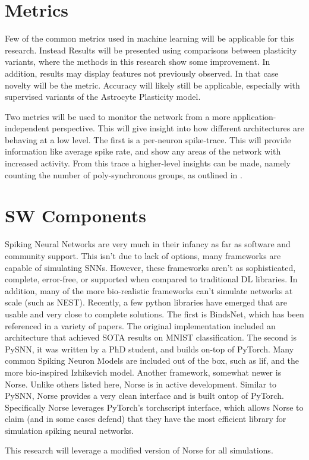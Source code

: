     \section{Metrics} \label{section:metrics}
    Few of the common metrics used in machine learning will be applicable for
    this research. Instead Results will be presented using comparisons between
    plasticity variants, where the methods in this research show some
    improvement. In addition, results may display features not previously
    observed. In that case novelty will be the metric. Accuracy will likely
    still be applicable, especially with supervised variants of the Astrocyte
    Plasticity model.
    
    Two metrics will be used to monitor the network from a more
    application-independent perspective. This will give insight into how
    different architectures are behaving at a low level. The first is a
    per-neuron spike-trace. This will provide information like average spike
    rate, and show any areas of the network with increased activity. From this
    trace a higher-level insights can be made, namely counting the number of
    poly-synchronous groups, as outlined in \cite{sgnn_transistor}.
    
    \section{SW Components}
    Spiking Neural Networks are very much in their infancy as far as software
    and community support. This isn't due to lack of options, many frameworks
    are capable of simulating SNNs. However, these frameworks aren't as
    sophisticated, complete, error-free, or supported when compared to
    traditional DL libraries. In addition, many of the more bio-realistic
    frameworks can't simulate networks at scale (such as NEST). Recently, a few
    python libraries have emerged that are usable and very close to complete
    solutions. The first is BindsNet, which has been referenced in a variety of
    papers. The original implementation included an architecture that achieved
    SOTA results on MNIST classification. The second is PySNN, it was written by
    a PhD student, and builds on-top of PyTorch. Many common Spiking Neuron
    Models are included out of the box, such as \Gls{lif}, and the more bio-inspired
    Izhikevich model. Another framework, somewhat newer is Norse. Unlike others
    listed here, Norse is in active development. Similar to PySNN, Norse
    provides a very clean interface and is built ontop of PyTorch. Specifically
    Norse leverages PyTorch's torchscript interface, which allows Norse to claim
    (and in some cases defend) that they have the most efficient library for
    simulation spiking neural networks.

    This research will leverage a modified version of Norse for all simulations.
    
